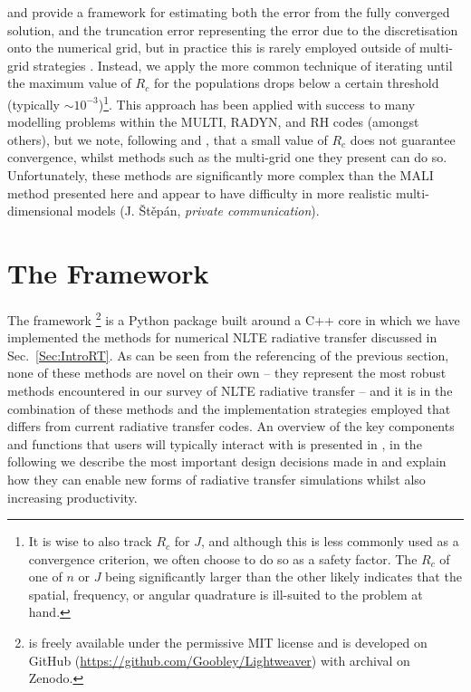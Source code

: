 \citet{Auer1994a} and \citet{FabianiBendicho1997} provide a framework for estimating both the error from the fully converged solution, and the truncation error representing the error due to the discretisation onto the numerical grid, but in practice this is rarely employed outside of multi-grid strategies \citep[e.g.][]{FabianiBendicho1997,Leger2007}.
Instead, we apply the more common technique of iterating until the maximum value of $R_c$ for the populations drops below a certain threshold (typically $\sim 10^{-3}$)\footnote{It is wise to also track $R_c$ for $J$, and although this is less commonly used as a convergence criterion, we often choose to do so as a safety factor. The $R_c$ of one of $n$ or $J$ being significantly larger than the other likely indicates that the spatial, frequency, or angular quadrature is ill-suited to the problem at hand.}.
This approach has been applied with success to many modelling problems within the MULTI, RADYN, and RH \citet{Uitenbroek2001} codes (amongst others), but we note, following \citet{Auer1994a} and \citet{FabianiBendicho1997}, that a small value of $R_c$ does not guarantee convergence, whilst methods such as the multi-grid one they present can do so.
Unfortunately, these methods are significantly more complex than the MALI method presented here and appear to have difficulty in more realistic multi-dimensional models (J. Štěpán, \emph{private communication}).

\section{The \Lw{} Framework}

The \Lw{} framework \citep{Osborne2021, LightweaverZenodo}\footnote{\Lw{} is freely available under the permissive MIT license and is developed on GitHub (\url{https://github.com/Goobley/Lightweaver}) with archival on Zenodo.} is a Python package built around a C++ core in which we have implemented the methods for numerical NLTE radiative transfer discussed in Sec.~\ref{Sec:IntroRT}.
As can be seen from the referencing of the previous section, none of these methods are novel on their own -- they represent the most robust methods encountered in our survey of NLTE radiative transfer -- and it is in the combination of these methods and the implementation strategies employed that \Lw{} differs from current \Sota{} radiative transfer codes.
An overview of the key components and functions that users will typically interact with is presented in \citet{Osborne2021}, in the following we describe the most important design decisions made in \Lw{} and explain how they can enable new forms of radiative transfer simulations whilst also increasing productivity.

